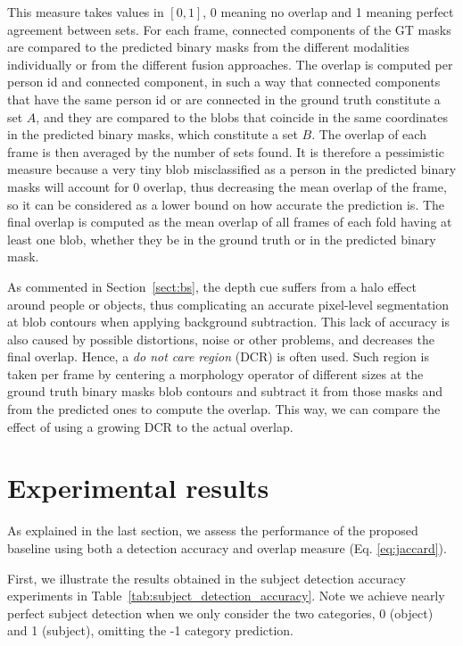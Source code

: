 \documentclass[10pt,twocolumn,letterpaper]{article}
\begin{document}
This measure takes values in $[0,1]$, 0 meaning no overlap and 1 meaning perfect agreement between sets. For each frame, connected components of the GT masks are compared to the predicted binary masks from the different modalities individually or from the different fusion approaches. The overlap is computed per person id and connected component, in such a way that connected components that have the same person id or are connected in the ground truth constitute a set $A$, and they are compared to the blobs that coincide in the same coordinates in the predicted binary masks, which constitute a set $B$. The overlap of each frame is then averaged by the number of sets found. It is therefore a pessimistic measure because a very tiny blob misclassified as a person in the predicted binary masks will account for 0 overlap, thus decreasing the mean overlap of the frame, so it can be considered as a lower bound on how accurate the prediction is. The final overlap is computed as the mean overlap of all frames of each fold having at least one blob, whether they be in the ground truth or in the predicted binary mask.

As commented in Section~\ref{sect:bs}, the depth cue suffers from a halo effect around people or objects, thus complicating an accurate pixel-level segmentation at blob contours when applying background subtraction. This lack of accuracy is also caused by possible distortions, noise or other problems, and decreases the final overlap. Hence, a \emph{do not care region} (DCR) is often used. Such region is taken per frame by centering a morphology operator of different sizes at the ground truth binary masks blob contours and subtract it from those masks and from the predicted ones to compute the overlap. This way, we can compare the effect of using a growing DCR to the actual overlap.

\section{Experimental results}
\label{ssec:experimentalresults}

As explained in the last section, we assess the performance of the proposed baseline using both a detection accuracy and overlap measure (Eq. \ref{eq:jaccard}). 

First, we illustrate the results obtained in the subject detection accuracy experiments in Table~\ref{tab:subject_detection_accuracy}. Note we achieve nearly perfect subject detection when we only consider the two categories, 0 (object) and 1 (subject), omitting the -1 category prediction.
\end{document}
